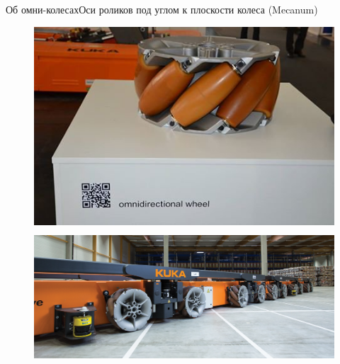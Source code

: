 \documentclass{beamer}
\begin{document}
\begin{frame}{Об омни-колесах}{Оси роликов под углом к плоскости колеса (Mecanum)}
    \vspace{10pt}
    \begin{figure}[H]
        \centering
        \begin{columns}
                \centering
                \includegraphics[width=\linewidth]{content/pic/photo/wheel_mecanum.jpg}
        \end{columns}
    \end{figure}
    \vspace{-55pt}
    \begin{figure}[H]
        \centering
        \begin{columns}
                \centering
                \includegraphics[width=\linewidth]{content/pic/photo/vehicle_kuka.png}
        \end{columns}
    \end{figure}
\end{frame}

\begin{frame}
  \tableofcontents
\end{frame}
\end{document}
